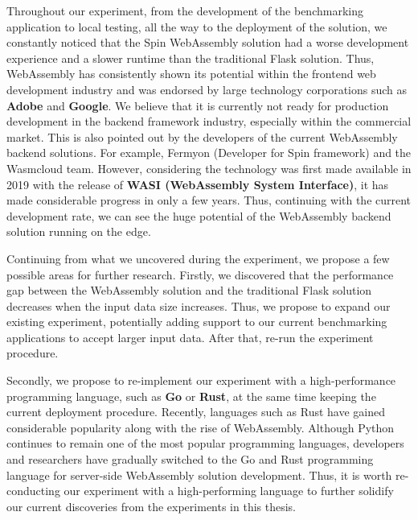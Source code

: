 Throughout our experiment, from the development of the benchmarking application to local testing, all the way to the deployment of the solution, we constantly noticed that the Spin WebAssembly solution had a worse development experience and a slower runtime than the traditional Flask solution. Thus, WebAssembly has consistently shown its potential within the frontend web development industry and was endorsed by large technology corporations such as \textbf{Adobe} and \textbf{Google}. We believe that it is currently not ready for production development in the backend framework industry, especially within the commercial market. This is also pointed out by the developers of the current WebAssembly backend solutions. For example, Fermyon (Developer for Spin framework) and the Wasmcloud team. However, considering the technology was first made available in 2019 with the release of \textbf{WASI (WebAssembly System Interface)}, it has made considerable progress in only a few years. Thus, continuing with the current development rate, we can see the huge potential of the WebAssembly backend solution running on the edge.

Continuing from what we uncovered during the experiment, we propose a few possible areas for further research. Firstly, we discovered that the performance gap between the WebAssembly solution and the traditional Flask solution decreases when the input data size increases. Thus, we propose to expand our existing experiment, potentially adding support to our current benchmarking applications to accept larger input data. After that, re-run the experiment procedure.

Secondly, we propose to re-implement our experiment with a high-performance programming language, such as \textbf{Go} or \textbf{Rust}, at the same time keeping the current deployment procedure. Recently, languages such as Rust have gained considerable popularity along with the rise of WebAssembly. Although Python continues to remain one of the most popular programming languages, developers and researchers have gradually switched to the Go and Rust programming language for server-side WebAssembly solution development. Thus, it is worth re-conducting our experiment with a high-performing language to further solidify our current discoveries from the experiments in this thesis.